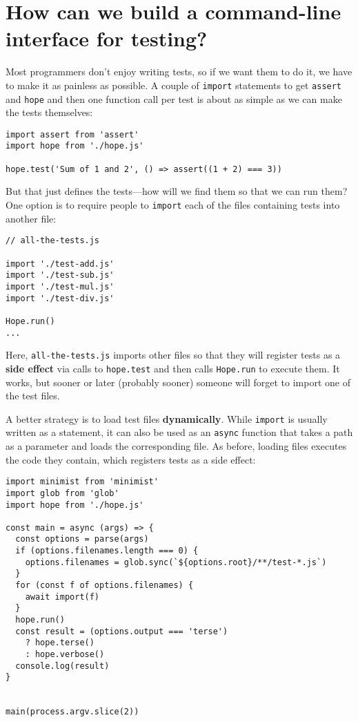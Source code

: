 \documentclass[krantzl]{krantz}
\newcommand{\glossref}[1]{\textbf{#1}}
\begin{document}
\section{How can we build a command-line interface for testing?}\label{unit-test-cli}


Most programmers don't enjoy writing tests,
so if we want them to do it,
we have to make it as painless as possible.
A couple of \texttt{import} statements to get \texttt{assert} and \texttt{hope}
and then one function call per test
is about as simple as we can make the tests themselves:


\begin{lstlisting}[frame=single,frameround=tttt]
import assert from 'assert'
import hope from './hope.js'

hope.test('Sum of 1 and 2', () => assert((1 + 2) === 3))
\end{lstlisting}



But that just defines the tests---how will we find them so that we can run them?
One option is to require people to \texttt{import} each of the files containing tests
into another file:

\begin{lstlisting}[frame=single,frameround=tttt]
// all-the-tests.js

import './test-add.js'
import './test-sub.js'
import './test-mul.js'
import './test-div.js'

Hope.run()
...
\end{lstlisting}


\noindent Here,
\texttt{all-the-tests.js} imports other files so that they will register tests
as a \glossref{side effect} via calls to \texttt{hope.test}
and then calls \texttt{Hope.run} to execute them.
It works,
but sooner or later (probably sooner) someone will forget to import one of the test files.


A better strategy is to load test files \glossref{dynamically}.
While \texttt{import} is usually written as a statement,
it can also be used as an \texttt{async} function
that takes a path as a parameter and loads the corresponding file.
As before,
loading files executes the code they contain,
which registers tests as a side effect:


\begin{lstlisting}[frame=single,frameround=tttt]
import minimist from 'minimist'
import glob from 'glob'
import hope from './hope.js'

const main = async (args) => {
  const options = parse(args)
  if (options.filenames.length === 0) {
    options.filenames = glob.sync(`${options.root}/**/test-*.js`)
  }
  for (const f of options.filenames) {
    await import(f)
  }
  hope.run()
  const result = (options.output === 'terse')
    ? hope.terse()
    : hope.verbose()
  console.log(result)
}


main(process.argv.slice(2))
\end{lstlisting}
\end{document}
